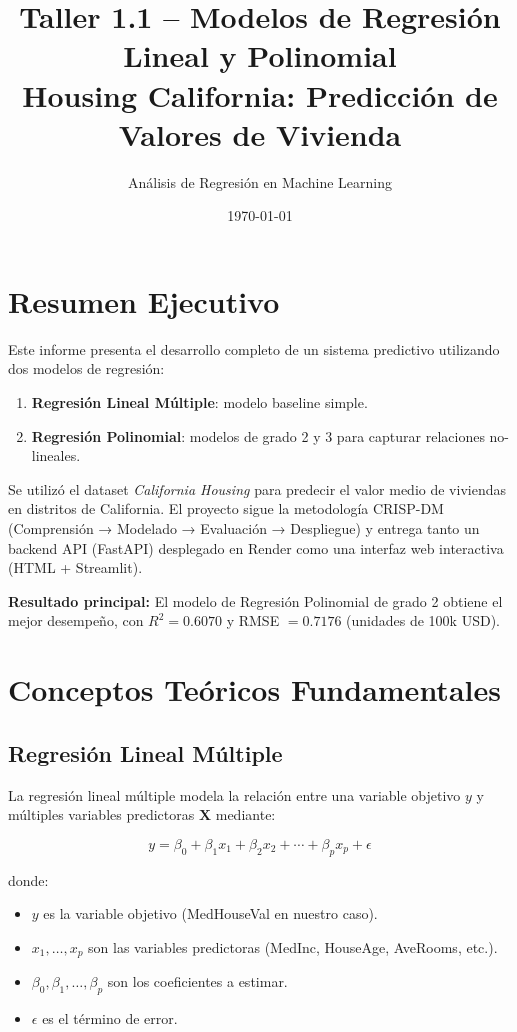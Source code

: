 \documentclass[11pt,a4paper]{article}
\title{Taller 1.1 -- Modelos de Regresión Lineal y Polinomial\\
Housing California: Predicción de Valores de Vivienda}
\author{Análisis de Regresión en Machine Learning}
\date{\today}
\begin{document}
\maketitle

\section{Resumen Ejecutivo}

Este informe presenta el desarrollo completo de un sistema predictivo utilizando dos modelos de regresión: 
\begin{enumerate}
  \item \textbf{Regresión Lineal Múltiple}: modelo baseline simple.
  \item \textbf{Regresión Polinomial}: modelos de grado 2 y 3 para capturar relaciones no-lineales.
\end{enumerate}

Se utilizó el dataset \textit{California Housing} para predecir el valor medio de viviendas en distritos de California. 
El proyecto sigue la metodología CRISP-DM (Comprensión → Modelado → Evaluación → Despliegue) 
y entrega tanto un backend API (FastAPI) desplegado en Render como una interfaz web interactiva (HTML + Streamlit).

\textbf{Resultado principal:} El modelo de Regresión Polinomial de grado 2 obtiene el mejor desempeño, 
con $R^2 = 0.6070$ y RMSE $= 0.7176$ (unidades de 100k USD).

\section{Conceptos Teóricos Fundamentales}

\subsection{Regresión Lineal Múltiple}

La regresión lineal múltiple modela la relación entre una variable objetivo $y$ y múltiples variables predictoras $\mathbf{X}$ mediante:

\begin{equation}
y = \beta_0 + \beta_1 x_1 + \beta_2 x_2 + \cdots + \beta_p x_p + \epsilon
\end{equation}

donde:
\begin{itemize}
  \item $y$ es la variable objetivo (MedHouseVal en nuestro caso).
  \item $x_1, \ldots, x_p$ son las variables predictoras (MedInc, HouseAge, AveRooms, etc.).
  \item $\beta_0, \beta_1, \ldots, \beta_p$ son los coeficientes a estimar.
  \item $\epsilon$ es el término de error.
\end{itemize}
\end{document}
